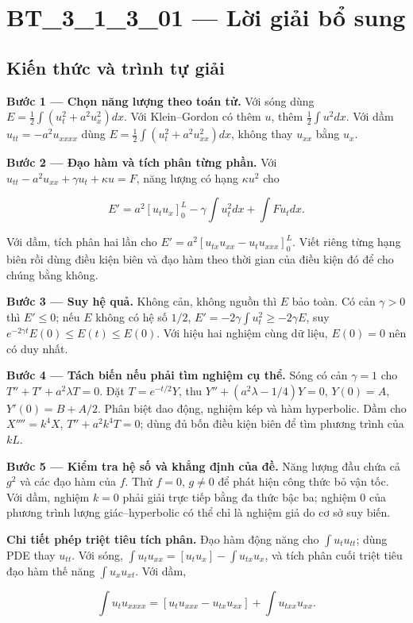 \documentclass[10pt,a4paper]{article}
\begin{document}
\section*{BT\_3\_1\_3\_01 — Lời giải bổ sung}
\subsection*{Kiến thức và trình tự giải}
\textbf{Bước 1 — Chọn năng lượng theo toán tử.} Với sóng dùng $E=\frac12\int(u_t^2+a^2u_x^2)dx$. Với Klein–Gordon có thêm $u$, thêm $\frac12\int u^2dx$. Với dầm $u_{tt}=-a^2u_{xxxx}$ dùng $E=\frac12\int(u_t^2+a^2u_{xx}^2)dx$, không thay $u_{xx}$ bằng $u_x$.

\textbf{Bước 2 — Đạo hàm và tích phân từng phần.} Với $u_{tt}-a^2u_{xx}+\gamma u_t+\kappa u=F$, năng lượng có hạng $\kappa u^2$ cho


\[
E'=a^2[u_tu_x]_0^L-\gamma\int u_t^2dx+\int Fu_tdx.
\]


Với dầm, tích phân hai lần cho $E'=a^2[u_{tx}u_{xx}-u_tu_{xxx}]_0^L$. Viết riêng từng hạng biên rồi dùng điều kiện biên và đạo hàm theo thời gian của điều kiện đó để cho chúng bằng không.

\textbf{Bước 3 — Suy hệ quả.} Không cản, không nguồn thì $E$ bảo toàn. Có cản $\gamma>0$ thì $E'\le0$; nếu $E$ không có hệ số $1/2$, $E'=-2\gamma\int u_t^2\ge-2\gamma E$, suy $e^{-2\gamma t}E(0)\le E(t)\le E(0)$. Với hiệu hai nghiệm cùng dữ liệu, $E(0)=0$ nên có duy nhất.

\textbf{Bước 4 — Tách biến nếu phải tìm nghiệm cụ thể.} Sóng có cản $\gamma=1$ cho $T''+T'+a^2\lambda T=0$. Đặt $T=e^{-t/2}Y$, thu $Y''+(a^2\lambda-1/4)Y=0$, $Y(0)=A$, $Y'(0)=B+A/2$. Phân biệt dao động, nghiệm kép và hàm hyperbolic. Dầm cho $X''''=k^4X$, $T''+a^2k^4T=0$; dùng đủ bốn điều kiện biên để tìm phương trình của $kL$.

\textbf{Bước 5 — Kiểm tra hệ số và khẳng định của đề.} Năng lượng đầu chứa cả $g^2$ và các đạo hàm của $f$. Thử $f=0$, $g\ne0$ để phát hiện công thức bỏ vận tốc. Với dầm, nghiệm $k=0$ phải giải trực tiếp bằng đa thức bậc ba; nghiệm $0$ của phương trình lượng giác–hyperbolic có thể chỉ là nghiệm giả do cơ sở suy biến.

\textbf{Chi tiết phép triệt tiêu tích phân.} Đạo hàm động năng cho $\int u_tu_{tt}$; dùng PDE thay $u_{tt}$. Với sóng, $\int u_tu_{xx}=[u_tu_x]-\int u_{tx}u_x$, và tích phân cuối triệt tiêu đạo hàm thế năng $\int u_xu_{xt}$. Với dầm,


\[
\int u_tu_{xxxx}=[u_tu_{xxx}-u_{tx}u_{xx}]+\int u_{txx}u_{xx}.
\]
\end{document}

